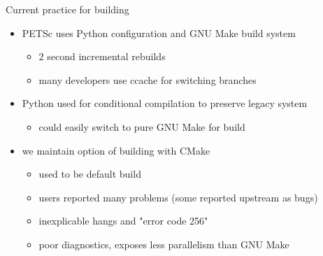 \documentclass{beamer}
\begin{document}
\begin{frame}{Current practice for building}
  \begin{itemize}
  \item PETSc uses Python configuration and GNU Make build system
    \begin{itemize}
    \item 2 second incremental rebuilds
    \item many developers use ccache for switching branches
    \end{itemize}
  \item Python used for conditional compilation to preserve legacy system
    \begin{itemize}
    \item could easily switch to pure GNU Make for build
    \end{itemize}
  \item we maintain option of building with CMake
    \begin{itemize}
    \item used to be default build
    \item users reported many problems (some reported upstream as bugs)
    \item inexplicable hangs and "error code 256"
    \item poor diagnostics, exposes less parallelism than GNU Make
    \end{itemize}
  \end{itemize}
\end{frame}
\end{document}
